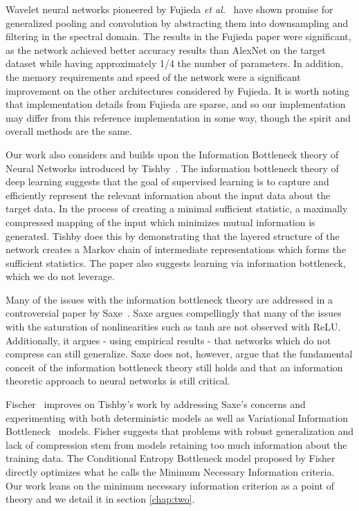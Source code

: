 Wavelet neural networks pioneered by Fujieda \textit{et al.}~\cite{fujieda2017wavelet} have shown promise for generalized pooling and convolution by abstracting them into downsampling and filtering in the spectral domain.
The results in the Fujieda paper were significant, as the network achieved better accuracy results than AlexNet on the target dataset while having approximately 1/4 the number of parameters.
In addition, the memory requirements and speed of the network were a significant improvement on the other architectures considered by Fujieda.
It is worth noting that implementation details from Fujieda are sparse, and so our implementation may differ from this reference implementation in some way, though the spirit and overall methods are the same.

Our work also considers and builds upon the Information Bottleneck theory of Neural Networks introduced by Tishby~\cite{tishby2015deep}.
The information bottleneck theory of deep learning suggests that the goal of supervised learning is to capture and efficiently represent the relevant information about the input data about the target data. 
In the process of creating a minimal sufficient statistic, a maximally compressed mapping of the input which minimizes mutual information is generated.
Tishby does this by demonstrating that the layered structure of the network creates a Markov chain of intermediate representations which forms the sufficient statistics.
The paper also suggests learning via information bottleneck, which we do not leverage.

Many of the issues with the information bottleneck theory are addressed in a controversial paper by Saxe~\cite{saxe2019information}.
Saxe argues compellingly that many of the issues with the saturation of nonlinearities such as tanh are not observed with ReLU.
Additionally, it argues - using empirical results - that networks which do not compress can still generalize. 
Saxe does not, however, argue that the fundamental conceit of the information bottleneck theory still holds and that an information theoretic approach to neural networks is still critical.

Fischer~\cite{fischer2020conditional} improves on Tishby's work by addressing Saxe's concerns and experimenting with both deterministic models as well as Variational Information Bottleneck~\cite{alemi2016deep} models. 
Fisher suggests that problems with robust generalization and lack of compression stem from models retaining too much information about the training data.
The Conditional Entropy Bottleneck model proposed by Fisher directly optimizes what he calls the Minimum Necessary Information criteria. 
Our work leans on the minimum necessary information criterion as a point of theory and we detail it in section \ref{chap:two}.

